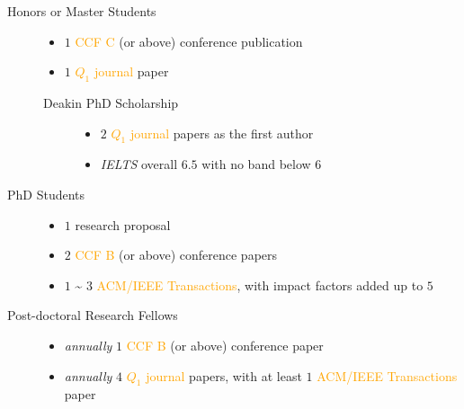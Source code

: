 \documentclass{tikzposter} %
\begin{document}
\begin{columns}
{}
{
	\begin{description}
		\item[Honors or Master Students] \hfill 
		\begin{itemize}
			\item $1$ \textcolor{orange}{CCF C} (or above) conference publication
			\item $1$ \textcolor{orange}{$Q_1$ journal} paper
		\end{itemize}
		\begin{description}
			\item[Deakin PhD Scholarship]  \hfill
			\begin{itemize}
				\item $2$ \textcolor{orange}{$Q_1$ journal} papers as the first author
				\item \textit{IELTS} overall $6.5$ with no band below $6$
			\end{itemize}
		\end{description}
	\item[PhD Students] \hfill 
	 \begin{itemize}
		\item $1$ research proposal
		\item $2$ \textcolor{orange}{CCF B} (or above) conference papers
		\item $1$ \textasciitilde{} $3$ \textcolor{orange}{ACM/IEEE Transactions},
		with impact factors added up to $5$
	\end{itemize}
	\item[Post-doctoral Research Fellows] \hfill 
	\begin{itemize}
		\item \textit{annually} $1$ \textcolor{orange}{CCF B} (or above) conference paper
		\item \textit{annually} $4$ \textcolor{orange}{$Q_1$ journal} papers,
		with at least $1$ \textcolor{orange}{ACM/IEEE Transactions} paper
	\end{itemize}

	\end{description}

}



\end{columns}
\end{document}
